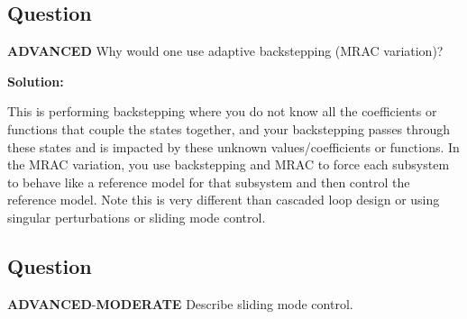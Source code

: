\documentclass{article}
\newenvironment{Solution}{
\begin{tcolorbox}
\color{purple}
\textbf{Solution:}
}
{
\end{tcolorbox}
\ignorespacesafterend
}
\newcommand{\RatingBase}[2]{\textcolor{#1}{{\fontfamily{phv}\selectfont\textbf{#2}}}}
\newcommand{\Moderate}{\RatingBase{yellow!50!black!50}{MODERATE}}
\newcommand{\Advanced}{\RatingBase{red!50!black!50}{ADVANCED}}
\begin{document}
\subsection{Question}
\Advanced{} Why would one use adaptive backstepping (MRAC variation)?

\begin{Solution}
This is performing backstepping where you do not know all the coefficients or functions that couple the states together, and your backstepping passes through these states and is impacted by these unknown values/coefficients or functions.  In the MRAC variation, you use backstepping and MRAC to force each subsystem to behave like a reference model for that subsystem and then control the reference model.  Note this is very different than cascaded loop design or using singular perturbations or sliding mode control.
\end{Solution}

\subsection{Question}
\Advanced{}-\Moderate{} Describe sliding mode control.
\end{document}
